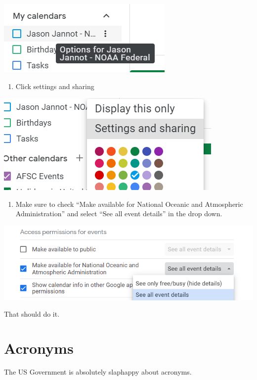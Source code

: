 \documentclass[
  letterpaper,
  DIV=11,
  numbers=noendperiod]{scrreprt}
\providecommand{\tightlist}{%
  \setlength{\itemsep}{0pt}\setlength{\parskip}{0pt}}\usepackage{longtable,booktabs,array}
\begin{document}
\includegraphics{_img/_gcalendar/pic1.png}

\begin{enumerate}
\def\labelenumi{\arabic{enumi}.}
\setcounter{enumi}{1}
\tightlist
\item
  Click settings and sharing
\end{enumerate}

\includegraphics{_img/_gcalendar/pic2.png}

\begin{enumerate}
\def\labelenumi{\arabic{enumi}.}
\setcounter{enumi}{2}
\tightlist
\item
  Make sure to check ``Make available for National Oceanic and
  Atmospheric Administration'' and select ``See all event details'' in
  the drop down.
\end{enumerate}

\includegraphics{_img/_gcalendar/pic3.png}

That should do it.

\chapter{Acronyms}\label{sec-acronyms}

The US Government is absolutely slaphappy about acronyms.
\end{document}
